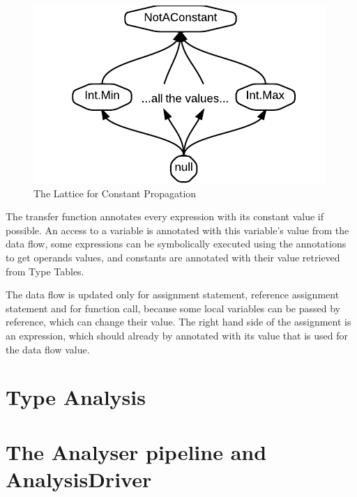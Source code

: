 \begin{figure}[h]  
  \centering
    \includegraphics{img/ConstLattice.pdf}  
    \caption{The Lattice for Constant Propagation\label{constlattice}}
\end{figure}        
        
        The transfer function annotates every expression 
        with its constant value if possible. An access to a 
        variable is annotated with this variable's value 
        from the data flow, some expressions can be symbolically 
        executed using the annotations to get operands values, 
        and constants are annotated with their value retrieved 
        from Type Tables.
        
        The data flow is updated only for assignment statement, 
        reference assignment statement and for function call, 
        because some local variables can be passed by reference, 
        which can change their value. The right hand side of 
        the assignment is an expression, which should already by 
        annotated with its value that is used for the data 
        flow value.
        

        

    \section{Type Analysis}

    \section{The Analyser pipeline and AnalysisDriver}
